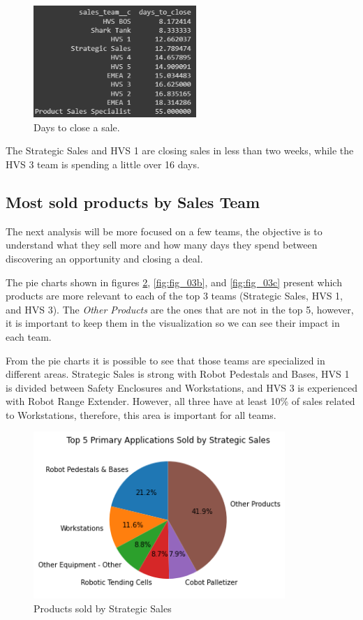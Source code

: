 \documentclass[]{report}
\begin{document}
\begin{figure}[htb]
	\centering
	\includegraphics[width=0.55\textwidth]{fig_02_a_days_to_win}
	\caption{Days to close a sale.}
	\label{fig:fig_02a}
\end{figure}

The Strategic Sales and HVS 1 are closing sales in less than two weeks, while the HVS 3 team is spending a little over 16 days.


\subsection{Most sold products by Sales Team}

The next analysis will be more focused on a few teams, the objective is to understand what they sell more and how many days they spend between discovering an opportunity and closing a deal.

The pie charts shown in figures \textcolor{blue}{\ref{fig:fig_03a}}, \textcolor{blue}{\ref{fig:fig_03b}}, and \textcolor{blue}{\ref{fig:fig_03c}} present which products are more relevant to each of the top 3 teams (Strategic Sales, HVS 1, and HVS 3). The \textit{Other Products} are the ones that are not in the top 5, however, it is important to keep them in the visualization so we can see their impact in each team.

From the pie charts it is possible to see that those teams are specialized in different areas. Strategic Sales is strong with Robot Pedestals and Bases, HVS 1 is divided between Safety Enclosures and Workstations, and HVS 3 is experienced with Robot Range Extender. However, all three have at least 10\% of sales related to Workstations, therefore, this area is important for all teams.

\begin{figure}[htb]
	\centering
	\includegraphics[width=0.85\textwidth]{fig_03_strategic_sales}
	\caption{Products sold by Strategic Sales}
	\label{fig:fig_03a}
\end{figure}
\end{document}
